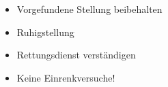 \label{m:ehi-verrenkung}
\begin{itemize}
    \item Vorgefundene Stellung beibehalten
    \item Ruhigstellung
    \item Rettungsdienst verständigen
    \item Keine Einrenkversuche!
\end{itemize}
